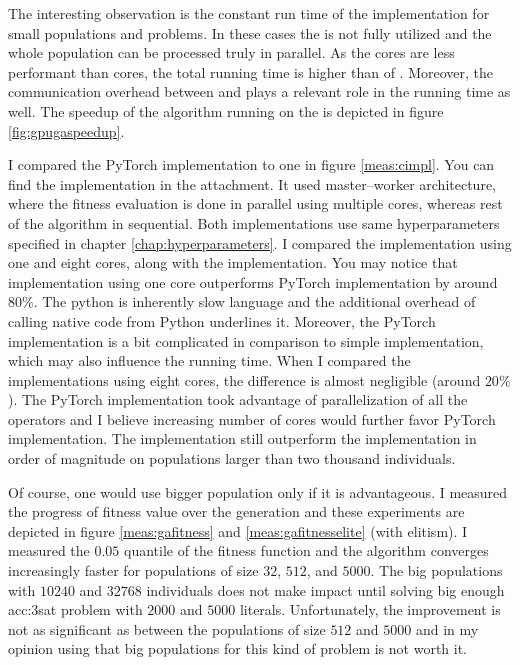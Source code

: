 The interesting observation is the constant run time of the \gpu implementation for small populations and problems. In these cases the \gpu is not fully utilized and the whole population can be processed truly in parallel. As the \cuda cores are less performant than \cpu cores, the total running time is higher than of \cpuns. Moreover, the communication overhead between \cpu and \gpu plays a relevant role in the running time as well. The speedup of the algorithm running on the \gpu is depicted in figure \ref{fig:gpugaspeedup}.

I compared the PyTorch implementation to \cpp one in figure \ref{meas:cimpl}. You can find the \cpp implementation in the attachment. It used master--worker architecture, where the fitness evaluation is done in parallel using multiple cores, whereas rest of the algorithm in sequential. Both implementations use same hyperparameters specified in chapter \ref{chap:hyperparameters}. I compared the implementation using one and eight cores, along with the \gpu implementation. You may notice that \cpp implementation using one core outperforms PyTorch implementation by around $80\%$. The python is inherently slow language and the additional overhead of calling native code from Python underlines it. Moreover, the PyTorch implementation is a bit complicated in comparison to simple \cpp implementation, which may also influence the running time. When I compared the implementations using eight cores, the difference is almost negligible (around $20\%$). The PyTorch implementation took advantage of parallelization of all the operators and I believe increasing number of cores would further favor PyTorch implementation. The \gpu implementation still outperform the \cpp implementation in order of magnitude on populations larger than two thousand individuals.

Of course, one would use bigger population only if it is advantageous. I measured the progress of fitness value over the generation and these experiments are depicted in figure \ref{meas:gafitness} and \ref{meas:gafitnesselite} (with elitism). I measured the $0.05$ quantile of the fitness function and the algorithm converges increasingly faster for populations of size $32$, $512$, and $5000$. The big populations with $10240$ and $32768$ individuals does not make impact until solving big enough \acrshort{acc:3sat} problem with $2000$ and $5000$ literals. Unfortunately, the improvement is not as significant as between the populations of size $512$ and $5000$ and in my opinion using that big populations for this kind of problem is not worth it.

